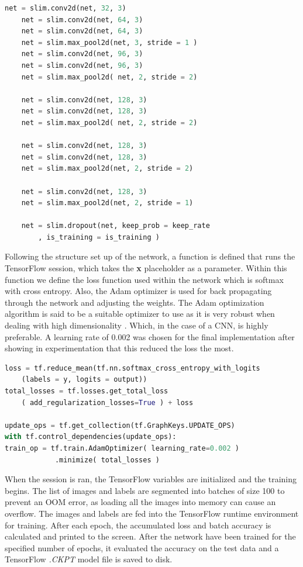 \begin{lstlisting}[language=python, frame=single]
	net = slim.conv2d(net, 32, 3)
	net = slim.conv2d(net, 64, 3)
	net = slim.conv2d(net, 64, 3)
	net = slim.max_pool2d(net, 3, stride = 1 )
	net = slim.conv2d(net, 96, 3)
	net = slim.conv2d(net, 96, 3)
	net = slim.max_pool2d( net, 2, stride = 2)
	
	net = slim.conv2d(net, 128, 3)
	net = slim.conv2d(net, 128, 3)
	net = slim.max_pool2d( net, 2, stride = 2)
	
	net = slim.conv2d(net, 128, 3)
	net = slim.conv2d(net, 128, 3)
	net = slim.max_pool2d(net, 2, stride = 2)
	
	net = slim.conv2d(net, 128, 3)
	net = slim.max_pool2d(net, 2, stride = 1)
	
	net = slim.dropout(net, keep_prob = keep_rate
		, is_training = is_training )
\end{lstlisting}

Following the structure set up of the network, a function is defined that runs the TensorFlow session, which takes the \textbf{x} placeholder as a parameter.
Within this function we define the loss function used within the network which is softmax with cross entropy. Also, the Adam optimizer is used for back propagating through the network and adjusting the weights. The Adam optimization algorithm is said to be a suitable optimizer to use as it is very robust when dealing with high dimensionality \citep{DBLP}. Which, in the case of a CNN, is highly preferable. A learning rate of 0.002 was chosen for the final implementation after showing in experimentation that this reduced the loss the most. 

\begin{lstlisting}[language=python, frame=single]
loss = tf.reduce_mean(tf.nn.softmax_cross_entropy_with_logits
    (labels = y, logits = output))
total_losses = tf.losses.get_total_loss
	( add_regularization_losses=True ) + loss

update_ops = tf.get_collection(tf.GraphKeys.UPDATE_OPS)
with tf.control_dependencies(update_ops):
train_op = tf.train.AdamOptimizer( learning_rate=0.002 )
			.minimize( total_losses )
\end{lstlisting}


When the session is ran, the TensorFlow variables are initialized and the training begins. 
The list of images and labels are segmented into batches of size 100 to prevent an OOM error, as loading all the images into memory can cause an overflow. The images and labels are fed into the TensorFlow runtime environment for training. After each epoch, the accumulated loss and batch accuracy is calculated and printed to the screen.
After the network have been trained for the specified number of epochs, it evaluated the accuracy on the test data and a TensorFlow \textit{.CKPT} model file is saved to disk.

